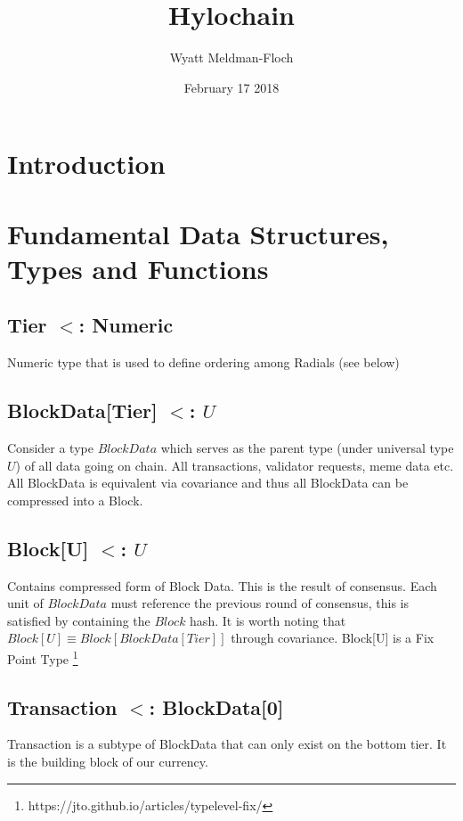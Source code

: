 \documentclass{article}
\title{Hylochain}
\author{Wyatt Meldman-Floch}
\date{February 17 2018}
\begin{document}
\maketitle

\begin{abstract}


\end{abstract}
\setcounter{secnumdepth}{0}
\section{Introduction}

\section{Fundamental Data Structures, Types and Functions}
\subsection{Tier $<$: Numeric}
Numeric type that is used to define ordering among Radials (see below)

\subsection{BlockData[Tier] $<$: $U$}
Consider a type $BlockData$ which serves as the parent type (under universal type $U$) of all data going on chain. All transactions, validator requests, meme data etc. All BlockData is equivalent via covariance and thus all BlockData can be compressed into a Block.

\subsection{Block[U] $<$: $U$}
Contains compressed form of Block Data. This is the result of consensus. Each unit of $BlockData$ must reference the previous round of consensus, this is satisfied by containing the $Block$ hash. It is worth noting that $Block[U] \equiv Block[BlockData[Tier]]$ through covariance. Block[U] is a Fix Point Type \footnote{https://jto.github.io/articles/typelevel-fix/}

\subsection{Transaction $<$: BlockData[0]}
Transaction is a subtype of BlockData that can only exist on the bottom tier. It is the building block of our currency.
\end{document}
